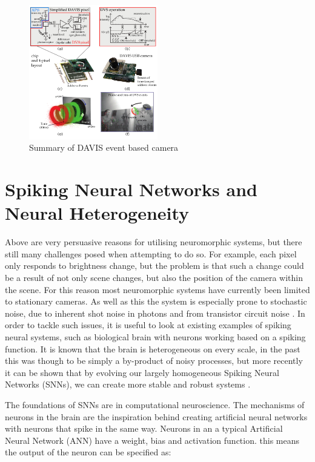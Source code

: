 \begin{figure}[htb]
      \centering
      \includegraphics[width=0.5\textwidth]{background/images/davis_camera.png}
      \caption{Summary of DAVIS event based camera\cite{EventBasedVisionASurvery}}
      \label{fig:davis_camera}
\end{figure}

\section{Spiking Neural Networks and Neural Heterogeneity}

Above are very persuasive reasons for utilising neuromorphic systems, but there still many challenges posed when attempting to do so. For example, each pixel only responds to brightness change, but the problem is that such a change could be a result of not only scene changes, but also the position of the camera within the scene. For this reason most neuromorphic systems have currently been limited to stationary cameras. As well as this the system is especially prone to stochastic noise, due to inherent shot noise in photons and from transistor circuit noise \cite{EventBasedVisionASurvery}. In order to tackle such issues, it is useful to look at existing examples of spiking neural systems, such as biological brain with neurons working based on a spiking function. It is known that the brain is heterogeneous on every scale, in the past this was though to be simply a by-product of noisy processes, but more recently it can be shown that by evolving our largely homogeneous Spiking Neural Networks (SNNs), we can create more stable and robust systems \cite{NeuralHetroPromRobLearn}.

The foundations of SNNs are in computational neuroscience. The mechanisms of neurons in the brain are the inspiration behind creating artificial neural networks with neurons that spike in the same way. Neurons in an a typical Artificial Neural Network (ANN) have a weight, bias and activation function. this means the output of the neuron can be specified as:

